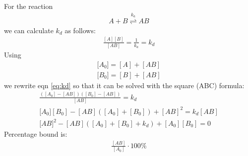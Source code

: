 \documentclass[11pt, fleqn]{report}
\begin{document}
For the reaction
\begin{eqnarray}
A+B \stackrel{k_a}{\rightleftharpoons} AB
\end{eqnarray}
we can calculate $k_d$ as follows:
\begin{eqnarray}
\frac{[A][B]}{[AB]} = \frac{1}{k_a} = k_d \label{eq:kd}
\end{eqnarray}
Using
\begin{eqnarray}
\lbrack A_0\rbrack = [A] + [AB] \\
\lbrack B_0\rbrack = [B] + [AB] 
\end{eqnarray}
we rewrite eqn \ref{eq:kd} so that it can be solved with the square (ABC) formula:
\begin{eqnarray}
\frac{([A_0]-[AB])([B_0]-[AB])}{[AB]} = k_d \\
\lbrack A_0 \rbrack[B_0]-[AB]([A_0]+[B_0])+[AB]^2= k_d [AB] \\
\lbrack AB \rbrack^2 - [AB]([A_0]+[B_0]+k_d) + [A_0][B_0] = 0
\end{eqnarray}
Percentage bound is:
\begin{eqnarray}
\frac{[AB]}{[A_0]}\cdot 100\%
\end{eqnarray}
\end{document}
